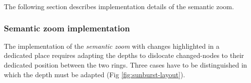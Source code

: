 The following section describes implementation details of the semantic zoom. %


\subsubsection{Semantic zoom implementation}
The implementation of the \emph{semantic zoom} with changes highlighted in a dedicated place requires adapting the depths to dislocate changed-nodes to their dedicated position between the two rings. Three cases have to be distinguished in which the depth must be adapted (Fig \ref{fig:sunburst-layout}).

